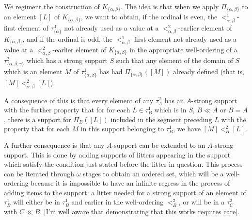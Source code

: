 \documentclass{slides}
\begin{document}
\begin{slide}

We regiment the construction of $K_{\{\alpha,\beta\}}$.  The idea is that when we apply $\Pi_{\{\alpha,\beta\}}$ to an  element $[L]$ of $K_{\{\alpha,\beta\}}$, we want to obtain, if the ordinal is even, the $<^1_{\alpha,\beta}$-first element of $\tau^0_{\{\alpha\}}$ not already used as a value at  a $<^2_{\alpha,\beta}$-earlier element of $K_{\{\alpha,\beta\}}$, and if the ordinal is odd,
the $<^1_{\alpha,\beta}$-first element not already used as a value at  a $<^2_{\alpha,\beta}$-earlier element of $K_{\{\alpha,\beta\}}$ in the appropriate well-ordering of a $\tau^2_{\{\alpha,\beta,\gamma\}}$ which has a strong support $S$ such that any element of the domain of $S$ which is an element $M$ of $\tau^1_{\{\alpha,\beta\}}$ 
has had $\Pi_{\{\alpha,\beta\}}([M])$ already defined (that is, $[M] <^2_{\alpha,\beta} [L]$).

\end{slide}

\begin{slide}

A consequence of this is that every element of any $\tau^2_A$ has an $A$-strong support with the further property that for for each $L \in \tau^1_B$ which is in $S$, $B \ll A$ or $B=A$,
there is a support for $\Pi_B([L])$ included in the segment  preceding $L$ with the property that for each $M$ in this support belonging to $\tau^1_B$, we have $[M]<^2_B[L]$.

A further consequence is that any $A$-support  can be extended to an $A$-strong support.  This is done by adding supports of litters appearing in the support which
satisfy the condition just stated before the litter in question.  This process can be iterated through $\omega$ stages to obtain an ordered set, which will be a well-ordering because it is impossible to have an infinite regress in the process of adding items to the support:  a litter  needed for a strong support of an element of $\tau^1_B$ will either be in $\tau^1_B$ and earlier in the well-ordering $<^2_B$, or will be in a $\tau^2_C$ with $C\ll B$.  [I'm well aware that demonstrating that this works requires care].


\end{slide}
\end{document}
